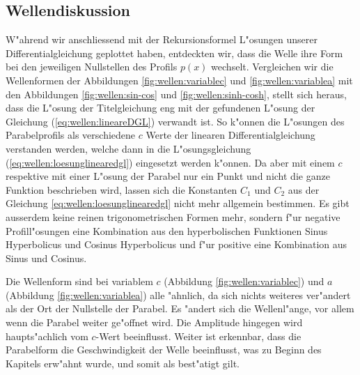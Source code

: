 \subsection{Wellendiskussion}
\label{sec:wellen:diskussionwellenform}
W"ahrend wir anschliessend mit der Rekursionsformel L"osungen unserer 
Differentialgleichung geplottet haben, entdeckten wir, dass die Welle ihre Form 
bei den jeweiligen Nullstellen des Profils $p(x)$ wechselt. Vergleichen wir die 
Wellenformen der Abbildungen \ref{fig:wellen:variablec} und 
\ref{fig:wellen:variablea} mit den Abbildungen \ref{fig:wellen:sin-cos} und 
\ref{fig:wellen:sinh-cosh}, stellt sich heraus, dass die L"osung der 
Titelgleichung eng mit der gefundenen L"osung der Gleichung 
(\ref{eq:wellen:lineareDGL}) verwandt ist. So k"onnen die L"osungen des 
Parabelprofils als verschiedene $c$ Werte der linearen Differentialgleichung 
verstanden werden, welche dann in die L"osungsgleichung 
(\ref{eq:wellen:loesunglinearedgl}) eingesetzt werden k"onnen. 
Da aber mit einem $c$ respektive mit einer L"osung der Parabel nur ein Punkt 
und nicht die ganze Funktion beschrieben wird, lassen sich die Konstanten $C_1$ 
und $C_2$ aus der Gleichung \ref{eq:wellen:loesunglinearedgl} nicht mehr 
allgemein bestimmen. Es gibt ausserdem keine reinen trigonometrischen Formen 
mehr, sondern f"ur negative Profill"osungen eine Kombination aus den 
hyperbolischen Funktionen Sinus Hyperbolicus und Cosinus Hyperbolicus und f"ur 
positive eine Kombination aus Sinus und Cosinus.

Die Wellenform sind bei variablem $c$ (Abbildung \ref{fig:wellen:variablec}) 
und $a$ (Abbildung \ref{fig:wellen:variablea}) alle "ahnlich, da sich nichts 
weiteres ver"andert als der Ort der Nullstelle der Parabel. Es "andert sich die 
Wellenl"ange, vor allem wenn die Parabel weiter ge"offnet wird. Die Amplitude 
hingegen wird haupts"achlich vom $c$-Wert beeinflusst. Weiter ist erkennbar, 
dass die Parabelform die Geschwindigkeit der Welle beeinflusst, was zu Beginn 
des Kapitels erw"ahnt wurde, und somit als best"atigt gilt.

